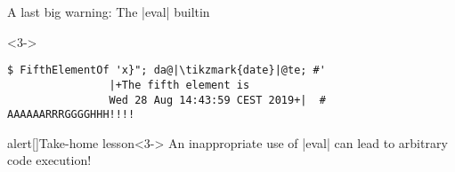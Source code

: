 \begin{frame}[fragile]{A last big warning: The \bash|eval| builtin}
\begin{overlayarea}{\textwidth}{0.64\textheight}
\begin{onlyenv}
        \end{onlyenv}
        \begin{onlyenv}<3->
            \begin{lstlisting}[style=MyBash, emph={[7]_fifth_array}, aboveskip=2mm]
                $ FifthElementOf 'x}"; da@|\tikzmark{date}|@te; #'
                |+The fifth element is
                Wed 28 Aug 14:43:59 CEST 2019+|  # AAAAAARRRGGGGHHH!!!!
            \end{lstlisting}
        \end{onlyenv}
    \end{overlayarea}
    {\Large\begin{varblock}{alert}[\textwidth]{Take-home lesson}<3->
        An inappropriate use of \bash|eval| can lead to \alert{arbitrary code execution}!
    \end{varblock}}
\end{frame}






